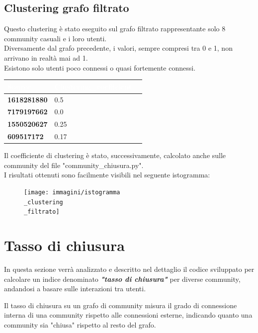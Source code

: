 \documentclass[12pt]{article}
\begin{document}
	\subsection{Clustering grafo filtrato}
	Questo clustering è stato eseguito sul grafo filtrato rappresentante solo 8 community casuali e i loro utenti.\\ Diversamente dal grafo precedente, i valori, sempre compresi tra 0 e 1, non arrivano in realtà mai ad 1.\\ 
	Esistono solo utenti poco connessi o quasi fortemente connessi.
	\begin{table}[H]
		\centering
		\begin{tabular}{|p{5cm}|p{5cm}|p{4cm}|}
			\hline
			\cellcolor{darkblue}\textcolor{white}{\textbf{Source}} & 
			\cellcolor{darkblue}\textcolor{white}{\textbf{Clustering\_coefficient}} \\
			\hline
			\textbf{1618281880} & 0.5 \\
			\hline
			\textbf{7179197662} & 0.0\\
			\hline
			\textbf{1550520627} & 0.25\\
			\hline
			\textbf{609517172} & 0.17 \\
			\hline
		\end{tabular}
	\end{table}
	Il coefficiente di clustering è stato, successivamente, calcolato anche sulle community del file "community\_chiusura.py".\\
	I risultati ottenuti sono facilmente visibili nel seguente istogramma:
	\begin{figure}[H]
		\centering
		\texttt{[image: immagini/istogramma\\\_clustering\\\_filtrato]}
	\end{figure}
	\newpage
	\section{Tasso di chiusura}
	In questa sezione verrà analizzato e descritto nel dettaglio il codice sviluppato per calcolare un indice denominato \textit{\textbf{"tasso di chiusura"}} per diverse community, andandosi a basare sulle interazioni tra utenti.
	\begin{boxH}
		Il tasso di chiusura su un grafo di community misura il grado di connessione interna di una community rispetto alle connessioni esterne, indicando quanto una community sia "chiusa" rispetto al resto del grafo.
	\end{boxH}
\end{document}

